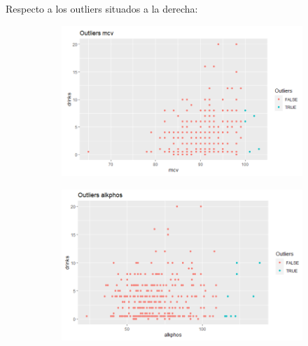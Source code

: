 \newpage
Respecto a los outliers situados a la derecha:
\begin{figure}[!tbh]
	\centering
	\begin{subfigure}{0.5\textwidth}
	\includegraphics[width=1\linewidth]{figures/outlier_3}
\caption{}
\label{fig:outlier3}
	\end{subfigure}\hfil %
	\begin{subfigure}{0.5\textwidth}
	\includegraphics[width=1\linewidth]{figures/outlier_4}
\caption{}
\label{fig:outlier4}
	\end{subfigure}\hfil %
	
	\medskip
	

\end{figure}
